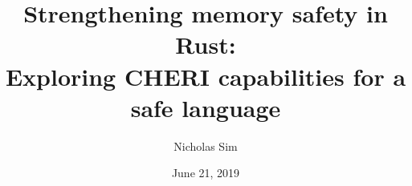 \documentclass{beamer}
\begin{document}
\title{Strengthening memory safety in Rust:\\
Exploring CHERI capabilities for a safe language}
\author{Nicholas Sim}
\date{June 21, 2019}

\frame{\titlepage}
\end{document}
